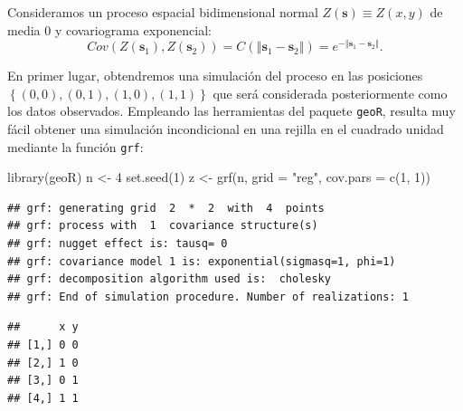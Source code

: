 \documentclass[
]{book}
\newenvironment{Shaded}{\begin{snugshade}}{\end{snugshade}}
\newcommand{\AttributeTok}[1]{\textcolor[rgb]{0.77,0.63,0.00}{#1}}
\newcommand{\CommentTok}[1]{\textcolor[rgb]{0.56,0.35,0.01}{\textit{#1}}}
\newcommand{\DecValTok}[1]{\textcolor[rgb]{0.00,0.00,0.81}{#1}}
\newcommand{\FunctionTok}[1]{\textcolor[rgb]{0.00,0.00,0.00}{#1}}
\newcommand{\NormalTok}[1]{#1}
\newcommand{\OtherTok}[1]{\textcolor[rgb]{0.56,0.35,0.01}{#1}}
\newcommand{\SpecialCharTok}[1]{\textcolor[rgb]{0.00,0.00,0.00}{#1}}
\newcommand{\StringTok}[1]{\textcolor[rgb]{0.31,0.60,0.02}{#1}}
\theoremstyle{break}
\theoremstyle{definition}
\theoremstyle{definition}
\theoremstyle{definition}
\theoremstyle{definition}
\theoremstyle{remark}
\begin{document}
Consideramos un proceso espacial bidimensional normal
\(Z(\mathbf{s})\equiv Z(x,y)\) de media 0 y covariograma
exponencial:
\[Cov(Z(\mathbf{s}_1),Z(\mathbf{s}_2)) 
= C(\left\Vert \mathbf{s}_1-\mathbf{s}_2\right\Vert )
= e^{-\left\Vert \mathbf{s}_1-\mathbf{s}_2\right\Vert }.\]

En primer lugar, obtendremos una simulación del proceso en las posiciones
\(\left\{(0,0),(0,1),(1,0),(1,1)\right\}\) que será considerada posteriormente
como los datos observados.
Empleando las herramientas del paquete \texttt{geoR}, resulta muy fácil obtener
una simulación incondicional en una rejilla en el cuadrado unidad
mediante la función \texttt{grf}:

\begin{Shaded}
\begin{Highlighting}[]
\FunctionTok{library}\NormalTok{(geoR)}
\NormalTok{n }\OtherTok{\textless{}{-}} \DecValTok{4}
\FunctionTok{set.seed}\NormalTok{(}\DecValTok{1}\NormalTok{)}
\NormalTok{z }\OtherTok{\textless{}{-}} \FunctionTok{grf}\NormalTok{(n, }\AttributeTok{grid =} \StringTok{"reg"}\NormalTok{, }\AttributeTok{cov.pars =} \FunctionTok{c}\NormalTok{(}\DecValTok{1}\NormalTok{, }\DecValTok{1}\NormalTok{))}
\end{Highlighting}
\end{Shaded}

\begin{verbatim}
## grf: generating grid  2  *  2  with  4  points
## grf: process with  1  covariance structure(s)
## grf: nugget effect is: tausq= 0 
## grf: covariance model 1 is: exponential(sigmasq=1, phi=1)
## grf: decomposition algorithm used is:  cholesky 
## grf: End of simulation procedure. Number of realizations: 1
\end{verbatim}

\begin{Shaded}
\end{Shaded}

\begin{verbatim}
##      x y
## [1,] 0 0
## [2,] 1 0
## [3,] 0 1
## [4,] 1 1
\end{verbatim}

\begin{Shaded}
\end{Shaded}
\end{document}
